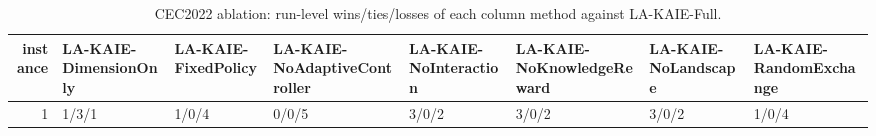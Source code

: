 \begin{table}[t]
\centering
\scriptsize
\caption{CEC2022 ablation: run-level wins/ties/losses of each column method against LA-KAIE-Full.}
\label{tab:cec2022_ablation_wtl}
\begin{tabular}{rlllllll}
\toprule
instance & LA-KAIE-DimensionOnly & LA-KAIE-FixedPolicy & LA-KAIE-NoAdaptiveController & LA-KAIE-NoInteraction & LA-KAIE-NoKnowledgeReward & LA-KAIE-NoLandscape & LA-KAIE-RandomExchange \\
\midrule
1 & 1/3/1 & 1/0/4 & 0/0/5 & 3/0/2 & 3/0/2 & 3/0/2 & 1/0/4 \\
\bottomrule
\end{tabular}
\end{table}
